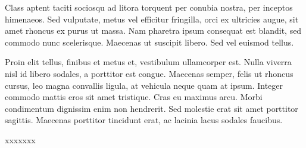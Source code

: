 Class aptent taciti sociosqu ad litora torquent per conubia nostra, per inceptos himenaeos. Sed vulputate, metus vel efficitur fringilla, orci ex ultricies augue, sit amet rhoncus ex purus ut massa. Nam pharetra ipsum consequat est blandit, sed commodo nunc scelerisque. Maecenas ut suscipit libero. Sed vel euismod tellus.

Proin elit tellus, finibus et metus et, vestibulum ullamcorper est. Nulla viverra nisl id libero sodales, a porttitor est congue. Maecenas semper, felis ut rhoncus cursus, leo magna convallis ligula, at vehicula neque quam at ipsum. Integer commodo mattis eros sit amet tristique. Cras eu maximus arcu. Morbi condimentum dignissim enim non hendrerit. Sed molestie erat sit amet porttitor sagittis. Maecenas porttitor tincidunt erat, ac lacinia lacus sodales faucibus.

xxxxxxx
